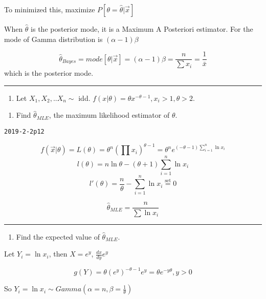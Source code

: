 \documentclass[12pt,]{article}
\providecommand{\tightlist}{%
  \setlength{\itemsep}{0pt}\setlength{\parskip}{0pt}}
\begin{document}
To minimized this, maximize \(P[\theta=\hat\theta|\vec x]\)

When \(\hat\theta\) is the posterior mode, it is a Maximum A Posteriori
estimator. For the mode of Gamma distribution is \((\alpha-1)\beta\)

\[\hat\theta_{Bayes}=mode[\theta|\vec x]=(\alpha-1)\beta=\frac{n}{\sum x_i}=\frac{1}{\bar x}\]
which is the posterior mode.

\begin{center}\rule{0.5\linewidth}{\linethickness}\end{center}

\begin{enumerate}
\def\labelenumi{\arabic{enumi}.}
\setcounter{enumi}{4}
\tightlist
\item
  \textcolor[rgb]{0.5,0.5,0.5}{Let $X_1,X_2,..X_n\sim$ idd. $f(x|\theta)=\theta x^{-\theta-1}, x_i>1, \theta>2$.}
\end{enumerate}

\begin{enumerate}
\def\labelenumi{\alph{enumi}.}
\tightlist
\item
  \textcolor[rgb]{0.5,0.5,0.5}{Find $\hat\theta_{MLE}$, the maximum likelihood estimator of $\theta$.}
\end{enumerate}

\texttt{2019-2-2p12}

\[f(\vec x|\theta)=L(\theta)=\theta^n(\prod x_i)^{\theta-1}=\theta^n e^{(-\theta-1)\sum^n_{i=1} \ln x_i}\]
\[l(\theta)=n\ln\theta-(\theta+1)\sum^n_{i=1} \ln x_i\]
\[l'(\theta)=\frac{n}\theta-\sum^n_{i=1} \ln x_i\overset{\text{set}}{=}0\]

\[\hat\theta_{MLE}=\frac{n}{\sum\ln x_i}\]

\begin{center}\rule{0.5\linewidth}{\linethickness}\end{center}

\begin{enumerate}
\def\labelenumi{\alph{enumi}.}
\setcounter{enumi}{1}
\tightlist
\item
  \textcolor[rgb]{0.5,0.5,0.5}{Find the expected value of $\hat\theta_{MLE}$.}
\end{enumerate}

Let \(Y_i=\ln x_i\), then \(X=e^y\), \(\frac{dx}{dy}e^y\)

\[g(Y)=\theta(e^y)^{-\theta-1}e^y=\theta e^{-y\theta}, y>0\]

So \(Y_i=\ln x_i\sim Gamma(\alpha=n,\beta=\frac1{\theta})\)
\end{document}
